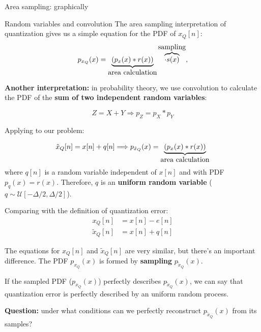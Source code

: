 \documentclass[10pt]{beamer}
\begin{document}
%
\begin{frame}{Area sampling: graphically}
\begin{center}
	\resizebox{0.9\textwidth}{!}{}
\end{center}	
\end{frame}

%
\begin{frame}{Random variables and convolution}
The area sampling interpretation of quantization gives us a simple equation for the PDF of $x_Q[n]$:
\begin{equation*}
p_{x_Q}(x) = \underbrace{(p_x(x) \ast r(x))}_{\text{\normalsize area calculation}}\overbrace{\cdot s(x)}^{\text{\normalsize sampling}},
\end{equation*}

\pause
\textbf{Another interpretation:} in probability theory, we use convolution to calculate the PDF of the \textbf{sum of two independent random variables}:

\begin{equation*}
Z = X + Y \Longrightarrow p_Z = p_X \ast p_Y
\end{equation*}

\pause
Applying to our problem:

\begin{equation*}
\tilde{x}_Q[n] = x[n] + q[n] \Longrightarrow p_{\tilde{x}_Q}(x) = \underbrace{(p_x(x) \ast r(x))}_{\text{\normalsize area calculation}}
\end{equation*}
where $q[n]$ is a random variable independent of $x[n]$ and with PDF $p_q(x) = r(x)$. Therefore, $q$ is an \textbf{uniform random variable} ($q\sim\mathcal{U}[-\Delta/2, \Delta/2]$).
\end{frame}

%
\begin{frame}
Comparing with the definition of quantization error:
\begin{align*}
x_Q[n] &= x[n] - e[n] \tag{from definition of quantization error} \\
\tilde{x}_Q[n] &= x[n] + q[n] \tag{from probabilistic interpreation of area sampling}
\end{align*}

The equations for $x_Q[n]$ and $\tilde{x}_Q[n]$ are very similar, but there's an important difference. The PDF $p_{x_Q}(x)$ is formed by \textbf{sampling} $p_{\tilde{x}_Q}(x)$.

\pause
\begin{center}
	\resizebox{0.55\textwidth}{!}{}
\end{center}

\pause
If the sampled PDF ($p_{x_Q}(x)$) perfectly describes $p_{\tilde{x}_Q}(x)$, we can say that quantization error is perfectly described by an uniform random process.

\pause 
\textbf{Question:}  under what conditions can we perfectly reconstruct $p_{\tilde{x}_Q}(x)$ from its samples? \\
\end{frame}
\end{document}
